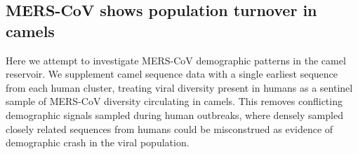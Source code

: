 \documentclass[11pt,oneside,letterpaper]{article}
\begin{document}

%


\subsection*{MERS-CoV shows population turnover in camels}

Here we attempt to investigate MERS-CoV demographic patterns in the camel reservoir.
We supplement camel sequence data with a single earliest sequence from each human cluster, treating viral diversity present in humans as a sentinel sample of MERS-CoV diversity circulating in camels.
This removes conflicting demographic signals sampled during human outbreaks, where densely sampled closely related sequences from humans could be misconstrued as evidence of demographic crash in the viral population.
\end{document}
